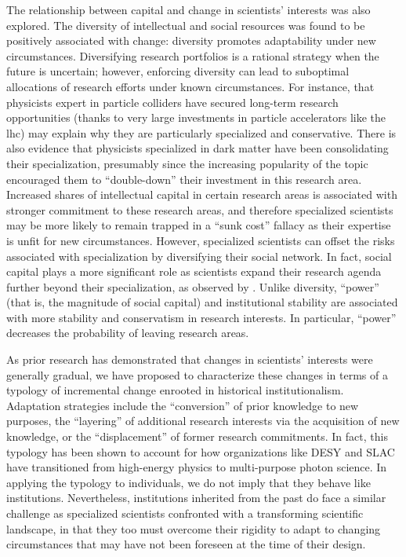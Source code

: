 \documentclass{article}
\begin{document}
The relationship between capital and change in scientists' interests was also explored. The diversity of intellectual and social resources was found to be positively associated with change: diversity promotes adaptability under new circumstances. Diversifying research portfolios is a rational strategy when the future is uncertain; however, enforcing diversity can lead to suboptimal allocations of research efforts under known circumstances. For instance, that physicists expert in particle colliders have secured long-term research opportunities (thanks to very large investments in particle accelerators like the \gls{lhc}) may explain why they are particularly specialized and conservative. There is also evidence that physicists specialized in dark matter have been consolidating their specialization, presumably since the increasing popularity of the topic encouraged them to ``double-down'' their investment in this research area. Increased shares of intellectual capital in certain research areas is associated with stronger commitment to these research areas, and therefore specialized scientists may be more likely to remain trapped in a ``sunk cost'' fallacy as their expertise is unfit for new circumstances. However, specialized scientists can offset the risks associated with specialization by diversifying their social network. In fact, social capital plays a more significant role as scientists expand their research agenda further beyond their specialization, as observed by \citealt{Tripodi2020}. Unlike diversity, ``power'' (that is, the magnitude of social capital) and institutional stability are associated with more stability and conservatism in research interests. In particular, ``power'' decreases the probability of leaving research areas.

As prior research has demonstrated that changes in scientists' interests were generally gradual, we have proposed to characterize these changes in terms of a typology of incremental change enrooted in historical institutionalism. Adaptation strategies include the ``conversion'' of prior knowledge to new purposes, the ``layering'' of additional research interests via the acquisition of new knowledge, or the ``displacement'' of former research commitments. In fact, this typology has been shown to account for how organizations like DESY and SLAC have transitioned from high-energy physics to multi-purpose photon science. In applying the typology to individuals, we do not imply that they behave like institutions. Nevertheless, institutions inherited from the past do face a similar challenge as specialized scientists confronted with a transforming scientific landscape, in that they too must overcome their rigidity to adapt to changing circumstances that may have not been foreseen at the time of  their design.
\end{document}
